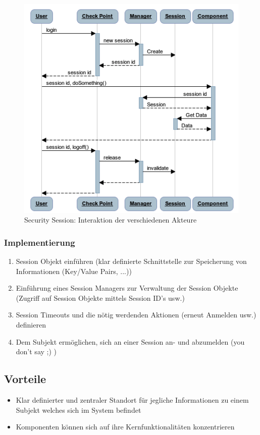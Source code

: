 \begin{figure}
	\centering
	\includegraphics[width=12cm]{content/system-access-control-architecture/images/security-session-interaction.png}
	\caption{Security Session: Interaktion der verschiedenen Akteure}
	\label{fig:securitysessioninteraction}
\end{figure}

\subsubsection*{Implementierung}
\begin{enumerate}
	\item Session Objekt einführen (klar definierte Schnittstelle zur Speicherung von Informationen (Key/Value Pairs, ...))
	\item Einführung eines Session Managers zur Verwaltung der Session Objekte (Zugriff auf Session Objekte mittels Session ID's usw.)
	\item Session Timeouts und die nötig werdenden Aktionen (erneut Anmelden usw.) definieren
	\item Dem Subjekt ermöglichen, sich an einer Session an- und abzumelden (you don't say ;) )
\end{enumerate}

\subsection*{Vorteile}
\begin{itemize}
	\item Klar definierter und zentraler Standort für jegliche Informationen zu einem Subjekt welches sich im System befindet
	\item Komponenten können sich auf ihre Kernfunktionalitäten konzentrieren
\end{itemize}

